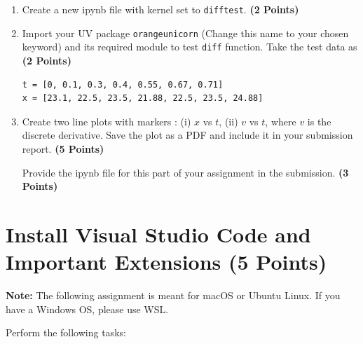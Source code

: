 \documentclass[12pt, xcolor=dvipsnames,svgnames,x11names]{article}
\begin{document}
\begin{enumerate}
\begin{verbatim}
# Launch Jupyter Notebook
jupyter notebook
\end{verbatim}

\item Create a new ipynb file with kernel set to \texttt{difftest}. \hfill \textbf{(2 Points)}
\item Import your UV package \texttt{orangeunicorn} (Change this name to your chosen keyword) and its required module to test \texttt{diff} function. Take the test data as \hfill \textbf{(2 Points)}


\begin{verbatim}
t = [0, 0.1, 0.3, 0.4, 0.55, 0.67, 0.71]
x = [23.1, 22.5, 23.5, 21.88, 22.5, 23.5, 24.88]
\end{verbatim}

\item Create two line plots with markers : (i) $x$ vs $t$, (ii) $v$ vs $t$, where $v$ is the discrete derivative. Save the plot as a PDF and include it in your submission report. \hfill \textbf{(5 Points)}

Provide the ipynb file for this part of your assignment in the submission. \hfill \textbf{(3 Points)}

\end{enumerate}

\section{Install Visual Studio Code and Important Extensions (5 Points)}

\textbf{Note:} The following assignment is meant for macOS or Ubuntu Linux. If you have a Windows OS, please use WSL.

Perform the following tasks:
\end{document}
